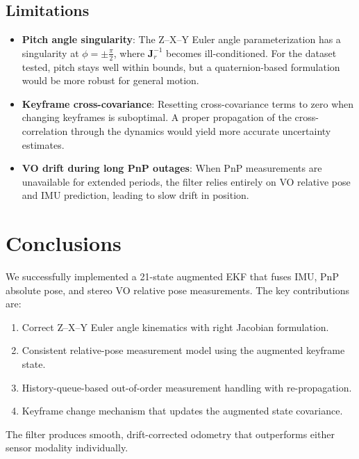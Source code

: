 \documentclass[11pt,a4paper]{article}
\begin{document}
\subsection{Limitations}
\label{sec:limits}

\begin{itemize}
  \item \textbf{Pitch angle singularity}: The Z--X--Y Euler angle parameterization has a singularity at \(\phi = \pm \frac{\pi}{2}\), where \(\mathbf{J}_r^{-1}\) becomes ill-conditioned. For the dataset tested, pitch stays well within bounds, but a quaternion-based formulation would be more robust for general motion.
  \item \textbf{Keyframe cross-covariance}: Resetting cross-covariance terms to zero when changing keyframes is suboptimal. A proper propagation of the cross-correlation through the dynamics would yield more accurate uncertainty estimates.
  \item \textbf{VO drift during long PnP outages}: When PnP measurements are unavailable for extended periods, the filter relies entirely on VO relative pose and IMU prediction, leading to slow drift in position.
\end{itemize}

\section{Conclusions}
\label{sec:conclusions}

We successfully implemented a 21-state augmented EKF that fuses IMU, PnP absolute pose, and stereo VO relative pose measurements. The key contributions are:

\begin{enumerate}
  \item Correct Z--X--Y Euler angle kinematics with right Jacobian formulation.
  \item Consistent relative-pose measurement model using the augmented keyframe state.
  \item History-queue-based out-of-order measurement handling with re-propagation.
  \item Keyframe change mechanism that updates the augmented state covariance.
\end{enumerate}

The filter produces smooth, drift-corrected odometry that outperforms either sensor modality individually.
\end{document}

